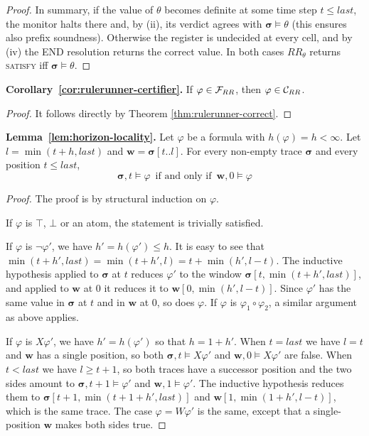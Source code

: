 \begin{proof}
\noindent
In summary, if the value of $\theta$ becomes definite at some time step $t\leq last$, the monitor
halts there and, by (ii), its verdict agrees with
$\boldsymbol{\sigma}\models\theta$ (this ensures also prefix soundness).
Otherwise the register is undecided at every cell, and by (iv) the END
resolution returns the correct value. In both cases $RR_\theta$ returns
\textsc{satisfy} iff $\boldsymbol{\sigma}\models\theta$.
\end{proof}


\noindent
\textbf{Corollary~\ref{cor:rulerunner-certifier}.}
If $\varphi \in {\ensuremath{\mathcal{F}}}_{RR}$, then $\varphi \in {\ensuremath{\mathcal{C}}}_{RR}$.

\begin{proof}
It follows directly by Theorem \ref{thm:rulerunner-correct}.
\end{proof}


\noindent
\textbf{Lemma~\ref{lem:horizon-locality}.}
Let $\varphi$ be a formula with $h(\varphi)=h<\infty$. Let $l=\min(t+h,last)$ and $\boldsymbol{w}=\boldsymbol{\sigma}[t..l]$. For every non-empty trace $\boldsymbol{\sigma}$ and every position $t\leq last$,
\[
\boldsymbol{\sigma},t\models\varphi
\,\text{ if and only if } \,
\boldsymbol{w},0\models\varphi
\]

\begin{proof}
The proof is by structural induction on $\varphi$.

If $\varphi$ is $\top$, $\bot$ or an atom, the statement is trivially satisfied.

If $\varphi$ is $\lnot\varphi'$, we have
$h'=h(\varphi')\leq h$. It is easy to see that $\min(t+h',last)=\min(t+h',l)=t+\min(h',l-t)$. 
The inductive hypothesis applied to $\boldsymbol{\sigma}$
at $t$ reduces $\varphi'$ to the window $\boldsymbol{\sigma}[t,\min(t+h',last)]$, and applied to $\boldsymbol{w}$ at $0$ it reduces it to $\boldsymbol{w}[0,\min(h',l-t)]$.
Since $\varphi'$ has the same value in $\boldsymbol{\sigma}$ at $t$ and in
$\boldsymbol{w}$ at $0$, so does $\varphi$.
%
If $\varphi$ is $\varphi_1\circ\varphi_2$, a similar argument as above applies.

If $\varphi$ is $X\varphi'$, we have $h'=h(\varphi')$ so that $h=1+h'$. When $t=last$ we
have $l=t$ and $\boldsymbol{w}$ has a single position, so both
$\boldsymbol{\sigma},t\models X\varphi'$ and
$\boldsymbol{w},0\models X\varphi'$ are false. When $t<last$ we have
$l\geq t+1$, so both traces have a successor position and
the two sides amount to $\boldsymbol{\sigma},t+1\models\varphi'$ and
$\boldsymbol{w},1\models\varphi'$. The inductive hypothesis reduces them to $\boldsymbol{\sigma}[t+1,\min(t+1+h',last)]$ and
$\boldsymbol{w}[1,\min(1+h',l-t)]$, which is the same trace. The case $\varphi=W\varphi'$ is
the same, except that a single-position $\boldsymbol{w}$ makes both sides true.
\end{proof}

